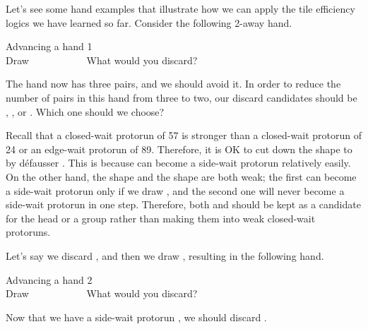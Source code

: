 {Let's see some hand examples that illustrate how we can apply the tile efficiency logics we have learned so far. Consider the following 2-away hand. 
\begin{itembox}[r]{Advancing a hand 1}
\bp
{}~\\
\hfill\footnotesize{Draw~~~~~~~~~~~}
\ep
\vspace{-17pt}What would you discard? \vspace{-5pt}
\end{itembox}
\noindent
The hand now has three pairs, and we should avoid it. In order to reduce the number of pairs in this hand from three to two, our discard candidates should be {\LARGE{}}, {\LARGE{}}, or {\LARGE{}}. Which one should we choose? 

\bigskip
Recall that a closed-wait protorun of 57 is stronger than a closed-wait protorun of 24 or an edge-wait protorun of 89. Therefore, it is OK to cut down the {\LARGE{}} shape to {\LARGE{}} by défausser {\LARGE{}}. This is because {\LARGE{}} can become a side-wait protorun relatively easily. On the other hand, the {\LARGE{}} shape and the {\LARGE{}} shape are both weak; the first can become a side-wait protorun only if we draw {\LARGE{}}, and the second one will never become a side-wait protorun in one step. Therefore, both {\LARGE{}} and {\LARGE{}} should be kept as a candidate for the head or a group rather than making them into weak closed-wait protoruns.

\bigskip
Let's say we discard {\LARGE{}}, and then we draw {\LARGE{}}, resulting in the following hand. 
\begin{itembox}[r]{Advancing a hand 2}
\bp
{}~\\
\hfill\footnotesize{Draw~~~~~~~~~~~}
\ep
\vspace{-17pt}What would you discard? \vspace{-5pt}
\end{itembox}
\noindent
Now that we have a side-wait protorun {\LARGE{}}, we should discard {\LARGE{}}. 

}
